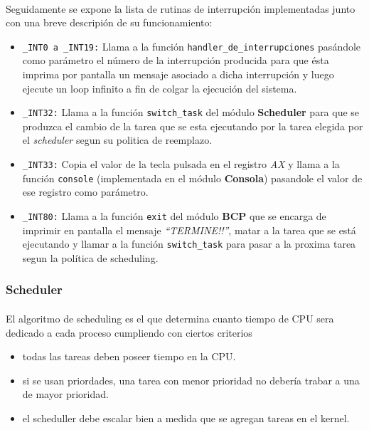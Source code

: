\documentclass[11pt, a4paper]{article}
\begin{document}
	\paragraph{}
	Seguidamente se expone la lista de rutinas de interrupción implementadas junto con una breve descripión de su funcionamiento:
	\begin{itemize}
		\item \texttt{\_INT0 a \_INT19:} Llama a la función \texttt{handler\_de\_interrupciones} pasándole como parámetro el número de la interrupción producida para que ésta imprima por pantalla un mensaje asociado a dicha interrupción y luego ejecute un loop infinito a fin de colgar la ejecución del sistema.
		\item \texttt{\_INT32:} Llama a la función \texttt{switch\_task} del módulo \textbf{Scheduler} para que se produzca el cambio de la tarea que se esta ejecutando por la tarea elegida por el \textit{scheduler} segun su politica de reemplazo.
		\item \texttt{\_INT33:} Copia el valor de la tecla pulsada en el registro \textit{AX} y llama a la función \texttt{console} (implementada en el módulo \textbf{Consola}) pasandole el valor de ese registro como parámetro.
		\item \texttt{\_INT80:} Llama a la función \texttt{exit} del módulo \textbf{BCP} que se encarga de imprimir en pantalla el mensaje \textit{``TERMINE!!''}, matar a la tarea que se está ejecutando y llamar a la función \texttt{switch\_task} para pasar a la proxima tarea segun la política de scheduling. 
	\end{itemize}

\subsubsection{Scheduler}
\label{sched}	
	\paragraph{}
	El algoritmo de scheduling es el que determina cuanto tiempo de CPU sera dedicado a cada proceso cumpliendo con ciertos criterios
	\begin{itemize}
		\item todas las tareas deben poseer tiempo en la CPU.
		\item si se usan priordades, una tarea con menor prioridad no debería trabar a una de mayor prioridad.
		\item el scheduller debe escalar bien a medida que se agregan tareas en el kernel.
	\end{itemize}
\end{document}

